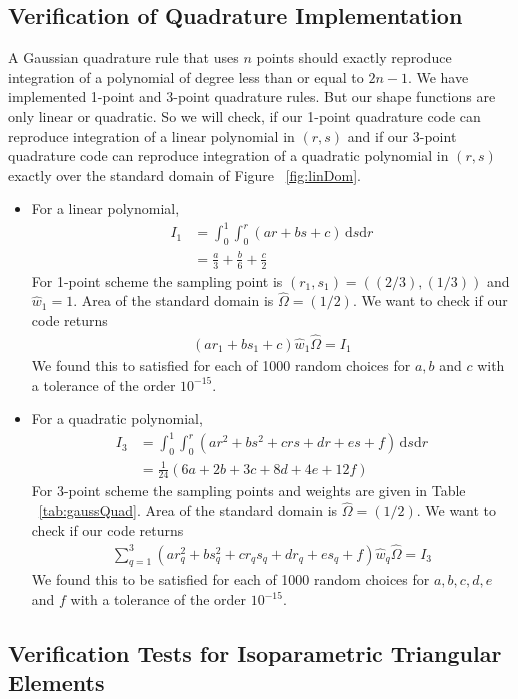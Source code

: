 \documentclass[../main.tex]{subfiles}
\begin{document}
\subsection*{Verification of Quadrature Implementation}
A Gaussian quadrature rule that uses $n$ points should exactly
reproduce integration of a polynomial of degree less than or equal to
$2n-1$. We have implemented 1-point and 3-point quadrature rules. But
our shape functions are only linear or quadratic. So we will check, if
our 1-point quadrature code can reproduce integration of a linear
polynomial in $(r,s)$ and if our 3-point quadrature code can reproduce
integration of a quadratic polynomial in $(r,s)$ exactly over the
standard domain of Figure ~\ref{fig:linDom}.
\begin{itemize}
\item For a linear polynomial,
  \begin{align*}
    I_1 &= \int_0^1\int_0^r\!(ar+bs+c)\,\mathrm{d}s\mathrm{d}r \\
        &= \frac{a}{3}+\frac{b}{6}+\frac{c}{2}
  \end{align*}
  For 1-point scheme the sampling point is $(r_1,s_1)=((2/3),(1/3))$
  and $\hat{w}_1 = 1$. Area of the standard domain is
  $\hat{\Omega} = (1/2)$. We want to check if our code returns
  \begin{align*}
    (ar_1+bs_1+c)\hat{w}_1\hat{\Omega} = I_1
  \end{align*}
  We found this to satisfied for each of 1000 random choices for $a,b$
  and $c$ with a tolerance of the order $10^{-15}$.
\item For a quadratic polynomial,
  \begin{align*}
    I_3 &= \int_0^1\int_0^r\!(ar^2+bs^2+crs+dr+es+f)\,\mathrm{d}s\mathrm{d}r \\
        &= \frac{1}{24}(6a+2b+3c+8d+4e+12f)
  \end{align*} 
  For 3-point scheme the sampling points and weights are given in
  Table ~\ref{tab:gaussQuad}. Area of the standard domain is
  $\hat{\Omega} = (1/2)$. We want to check if our code returns
  \begin{align*}
    \sum_{q=1}^3(ar^2_q+bs^2_q+cr_qs_q+dr_q+es_q+f)\hat{w}_q\hat{\Omega} = I_3
  \end{align*}
  We found this to be satisfied for each of 1000 random choices for
  $a,b,c,d,e$ and $f$ with a tolerance of the order $10^{-15}$.
\end{itemize}

\subsection*{Verification Tests for Isoparametric Triangular Elements}
\end{document}
